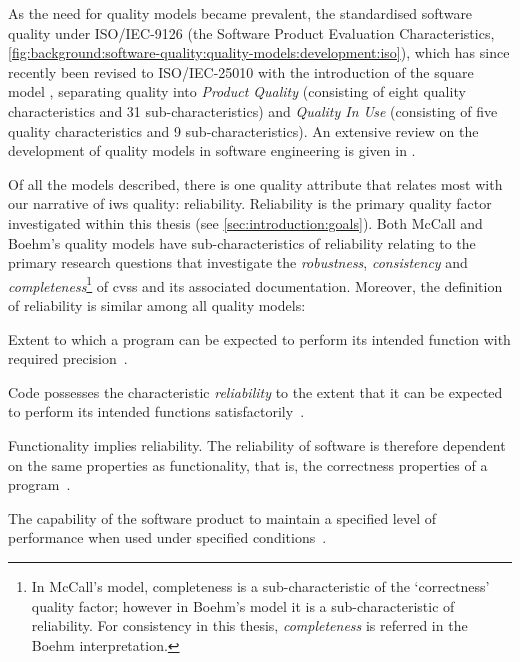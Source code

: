 As the need for quality models became prevalent, the \citeauthor{ISO9126:1999} standardised software quality under ISO/IEC-9126 \citep{ISO9126:1999} (the Software Product Evaluation Characteristics, \cref{fig:background:software-quality:quality-models:development:iso}), which has since recently been revised to ISO/IEC-25010 with the introduction of the \gls{square} model \citep{ISO25010:2011}, separating quality into \textit{Product Quality} (consisting of eight quality characteristics and 31 sub-characteristics) and \textit{Quality In Use} (consisting of five quality characteristics and 9 sub-characteristics).
An extensive review on the development of quality models in software engineering is given in \citep{AlQutaish:2010vua}.

Of all the models described, there is one quality attribute that relates most with our narrative of \gls{iws} quality: reliability. Reliability is the primary quality factor investigated within this thesis (see \cref{sec:introduction:goals}). Both McCall and Boehm's quality models have sub-characteristics of reliability relating to the primary research questions that investigate the \textit{robustness}, \textit{consistency} and \textit{completeness}\footnote{In McCall's model, completeness is a sub-characteristic of the `correctness' quality factor; however in Boehm's model it is a sub-characteristic of reliability. For consistency in this thesis, \textit{completeness} is referred in the Boehm interpretation.} of  \glspl{cvs} and its associated documentation. Moreover, the definition of reliability is similar among all quality models:

\begin{description}[font=\itshape,style=multiline,leftmargin=3cm]
  \item[\citeauthor{McCall:1977uy}] Extent to which a program can be expected to perform its intended function with required precision~\citep{McCall:1977uy}.
  \item[\citeauthor{Boehm:1978vv}] Code possesses the characteristic \textit{reliability} to the extent that it can be expected to perform its intended functions satisfactorily~\citep{Boehm:1978vv}.
  \item[\citeauthor{Dromey:1995wy}] Functionality implies reliability. The reliability of software is therefore  dependent on the same properties as functionality, that is, the correctness properties of a program~\citep{Dromey:1995wy}.
  \item[ISO/IEC-9126] The capability of the software product to maintain a specified level of performance when used under specified conditions~\citep{ISO9126:1999}.
\end{description}

